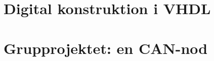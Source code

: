 \documentclass[10pt, twoside, openright]{book}
\begin{document}
\frontmatter

\tableofcontents


\mainmatter
\part{Digital konstruktion i VHDL}
\label{part:vhdl}










\part{Grupprojektet: en CAN-nod}
\label{part:can}












\appendix
{}





\end{document}
